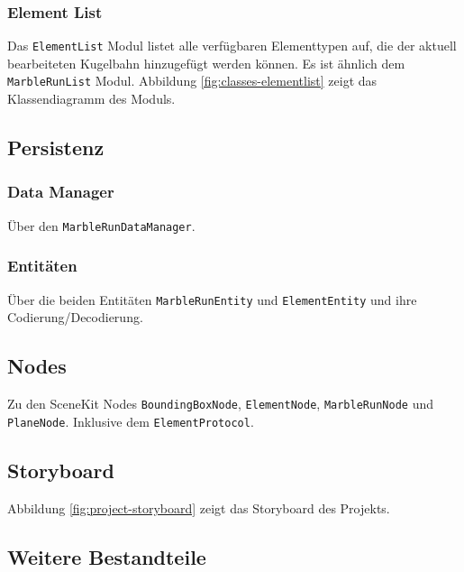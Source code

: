 
\subsubsection{Element List}

Das \texttt{ElementList} Modul listet alle verfügbaren Elementtypen auf, die der aktuell bearbeiteten Kugelbahn hinzugefügt werden können.
Es ist ähnlich dem \texttt{MarbleRunList} Modul.
Abbildung \ref{fig:classes-elementlist} zeigt das Klassendiagramm des Moduls.



\subsection{Persistenz}

\subsubsection{Data Manager} \label{subsub:umsetzung-datamanager}

Über den \texttt{MarbleRunDataManager}.

\subsubsection{Entitäten}

Über die beiden Entitäten \texttt{MarbleRunEntity} und \texttt{ElementEntity} und ihre Codierung/Decodierung.


\subsection{Nodes}

Zu den SceneKit Nodes \texttt{BoundingBoxNode}, \texttt{ElementNode}, \texttt{MarbleRunNode} und \texttt{PlaneNode}. Inklusive dem \texttt{ElementProtocol}.


\subsection{Storyboard}

Abbildung \ref{fig:project-storyboard} zeigt das Storyboard des Projekts.



\subsection{Weitere Bestandteile}

